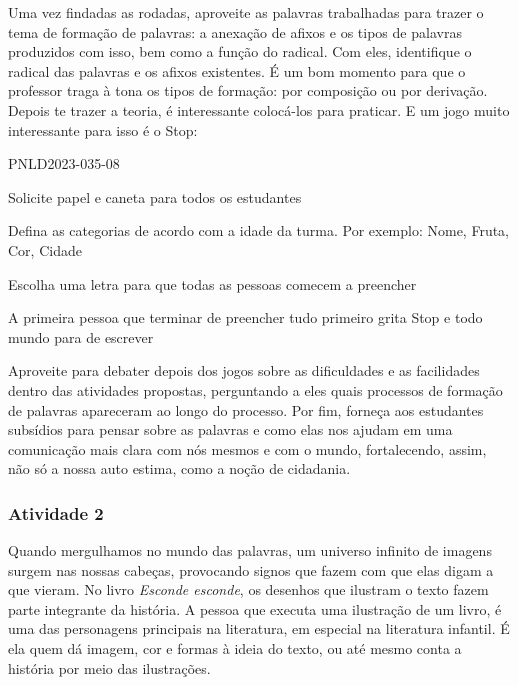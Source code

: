 \documentclass[11pt]{extarticle}
\begin{document}
Uma vez findadas as rodadas, aproveite as palavras trabalhadas para trazer o tema de formação de palavras: a anexação de afixos e os tipos de palavras produzidos com isso, bem como a função do radical. Com eles, identifique o radical das palavras e os afixos existentes. É um bom momento para que o professor traga à tona os tipos de formação: por composição ou por derivação. Depois te trazer a teoria, é interessante colocá-los para praticar. E um jogo muito interessante para isso é o Stop:

PNLD2023-035-08

\item Solicite papel e caneta para todos os estudantes
\item Defina as categorias de acordo com a idade da turma. Por exemplo: Nome, Fruta, Cor, Cidade
\item Escolha uma letra para que todas as pessoas comecem a preencher
\item A primeira pessoa que terminar de preencher tudo primeiro grita Stop e todo mundo para de escrever

Aproveite para debater depois dos jogos sobre as dificuldades e as facilidades dentro das atividades propostas, perguntando a eles quais processos de formação de palavras apareceram ao longo do processo. Por fim, forneça aos estudantes subsídios para pensar sobre as palavras e como elas nos ajudam em uma comunicação mais clara com nós mesmos e com o mundo, fortalecendo, assim, não só a nossa auto estima, como a noção de cidadania.

\subsubsection{Atividade 2}


Quando mergulhamos no mundo das palavras, um universo infinito de imagens surgem nas nossas cabeças, provocando signos que fazem com que elas digam a que vieram. No livro \textit{Esconde esconde}, os desenhos que ilustram o texto fazem parte integrante da história. A pessoa que executa uma ilustração de um livro, é uma das personagens principais na literatura, em especial na literatura infantil. É ela quem dá imagem, cor e formas à ideia do texto, ou até mesmo conta a história por meio das ilustrações. 
\end{document}
